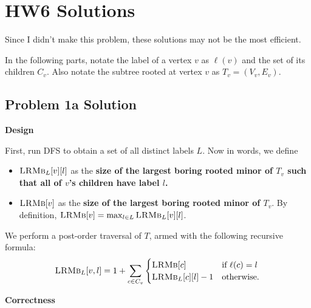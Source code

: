 \documentclass{article}
\begin{document}
\section*{HW6 Solutions}
    Since I didn’t make this problem, these solutions may not be the most efficient.
    
    \vspace{2mm}
    In the following parts, notate the label of a vertex $v$ as $\ell(v)$ and the set of its children $C_{v}$. Also notate the subtree rooted at vertex $v$ as $T_{v} = (V_{v}, E_{v})$.

\subsection*{Problem 1a Solution}
    \textbf{Design}
    
     First, run DFS to obtain a set of all distinct labels $L$. Now in words, we define
        \begin{itemize}
            \item $\textsc{LRMb}_{L}[v][l]$ as the \textbf{size of the largest boring rooted minor of $T_{v}$ such that all of $v$'s children have label $l$.} 
            \item $\textsc{LRMb}[v]$ as the \textbf{size of the largest boring rooted minor of $T_{v}$}. By definition, $\textsc{LRMb}[v] = \max_{l \in L} \textsc{LRMb}_{L}[v][l]$.
        \end{itemize}
    We perform a post-order traversal of $T$, armed with the following recursive formula:
        $$\textsc{LRMb}_{L}[v, l] = 1 + \sum_{c \in C_{v}} 
        \begin{cases}
            \textsc{LRMb}[c] & \text{if $\ell(c) = l$} \\
            \textsc{LRMb}_{L}[c][l] - 1 & \text{otherwise}.
        \end{cases}$$
        
    \vspace{2mm}
    \textbf{Correctness}
    
\end{document}
